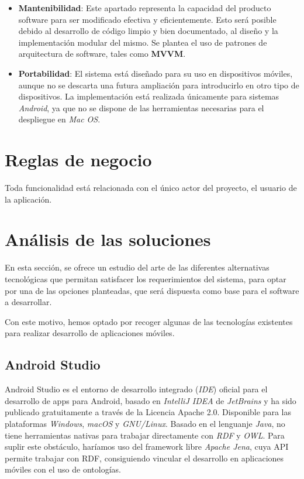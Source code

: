 \begin{itemize}
    \item \textbf{Mantenibilidad}: Este apartado representa la capacidad del producto software para 
    ser modificado efectiva y eficientemente. Esto será posible debido al desarrollo de código 
    limpio y bien documentado, al diseño y la implementación modular del mismo. Se plantea el uso 
    de patrones de arquitectura de software, tales como \textbf{MVVM}.

    \item \textbf{Portabilidad}: El sistema está diseñado para su uso en dispositivos móviles, 
    aunque no se descarta una futura ampliación para introducirlo en otro tipo de dispositivos.
    La implementación está realizada únicamente para sistemas \textit{Android}, ya que no 
    se dispone de las herramientas necesarias para el despliegue en \textit{Mac OS}. 

\end{itemize}

\section{Reglas de negocio}
Toda funcionalidad está relacionada con el único actor del proyecto, el usuario de la aplicación.

\section{Análisis de las soluciones}
En esta sección, se ofrece un estudio del arte de las diferentes alternativas tecnológicas que permitan satisfacer 
los requerimientos del sistema, para optar por una de las opciones planteadas, que será dispuesta como base 
para el software a desarrollar.\medskip

Con este motivo, hemos optado por recoger algunas de las tecnologías existentes para realizar desarrollo de aplicaciones 
móviles.

\subsection{Android Studio}
Android Studio es el entorno de desarrollo integrado (\textit{IDE}) oficial para el desarrollo de apps para Android, 
basado en \textit{IntelliJ IDEA} de \textit{JetBrains} y ha sido publicado gratuitamente a través de la Licencia Apache 2.0.
Disponible para las plataformas \textit{Windows}, \textit{macOS} y \textit{GNU/Linux}. Basado en el lenguanje \textit{Java},
no tiene herramientas nativas para trabajar directamente con \textit{RDF} y \textit{OWL}. Para suplir este obstáculo, 
haríamos uso del framework libre \textit{Apache Jena}, cuya API permite trabajar con RDF, consiguiendo vincular 
el desarrollo en aplicaciones móviles con el uso de ontologías.


